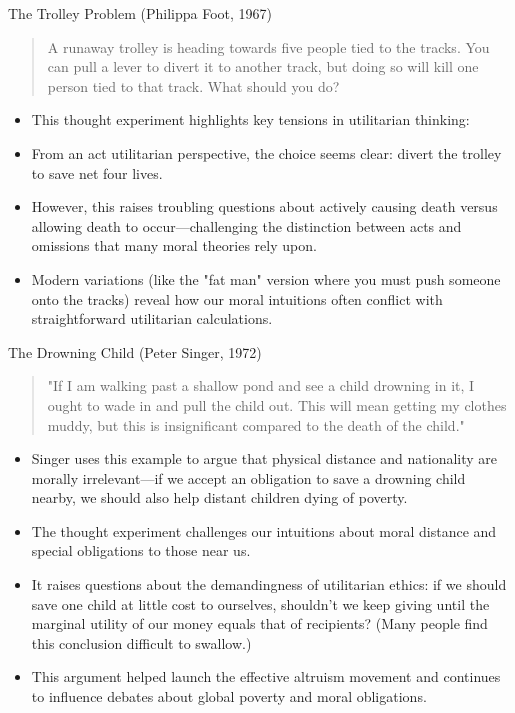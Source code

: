 \documentclass[aspectratio=169]{beamer}
\begin{document}
\begin{frame}{The Trolley Problem (Philippa Foot, 1967)}
    \begin{quote}
        A runaway trolley is heading towards five people tied to the tracks. You can pull a lever to divert it to another track, but doing so will kill one person tied to that track. What should you do?
    \end{quote}
    \begin{itemize}
        \item This thought experiment highlights key tensions in utilitarian thinking:
        
        \item From an act utilitarian perspective, the choice seems clear: divert the trolley to save net four lives.
        
        \item However, this raises troubling questions about actively causing death versus allowing death to occur—challenging the distinction between acts and omissions that many moral theories rely upon.
        
        \item Modern variations (like the "fat man" version where you must push someone onto the tracks) reveal how our moral intuitions often conflict with straightforward utilitarian calculations.
    \end{itemize}
\end{frame}

\begin{frame}{The Drowning Child (Peter Singer, 1972)}
    \begin{quote}
        "If I am walking past a shallow pond and see a child drowning in it, I ought to wade in and pull the child out. This will mean getting my clothes muddy, but this is insignificant compared to the death of the child."
    \end{quote}
    \begin{itemize}
        \item Singer uses this example to argue that physical distance and nationality are morally irrelevant—if we accept an obligation to save a drowning child nearby, we should also help distant children dying of poverty.
        
        \item The thought experiment challenges our intuitions about moral distance and special obligations to those near us. 
        
        \item It raises questions about the demandingness of utilitarian ethics: if we should save one child at little cost to ourselves, shouldn't we keep giving until the marginal utility of our money equals that of recipients? (Many people find this conclusion difficult to swallow.)
        
        \item This argument helped launch the effective altruism movement and continues to influence debates about global poverty and moral obligations.
    \end{itemize}
\end{frame}
\end{document}
